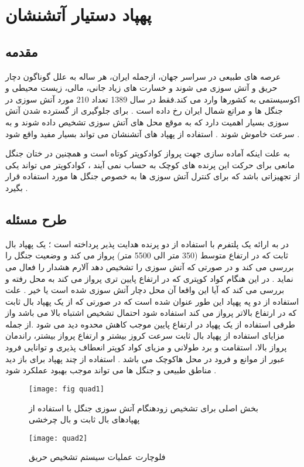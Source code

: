 \chapter{پهپاد دستیار آتشنشان}
\section{مقدمه}
\par
عرصه های طبیعی در سراسر جهان، ازجمله ایران، هر
ساله به علل گوناگون دچار حریق و آتش سوزی می شوند و 
خسارت های زیاد جانی، مالی، زیست محیطی و 
اکوسیستمی به کشورها وارد می کند.فقط در سال 1389
تعداد 210 مورد آتش سوزی در جنگل ها و مراتع شمال ایران 
رخ داده است 
\cite{eskandari2021fire}
. برای جلوگیری از گسترده شدن آتش سوزی بسیار اهمیت دارد که به موقع محل های آتش سوزی تشخیص داده  شوند و به سرعت خاموش شوند . استفاده از پهپاد های آتشنشان می تواند بسیار مفید واقع شود . 
\par
به علت اینکه آماده سازی جهت پرواز کوادکوپتر کوتاه است و همچنین در ختان جنگل مانعی برای حرکت این پرنده های کوچک به حساب نمی آیند  ، کوادکوپتر می تواند یکی از تجهیزاتی باشد که برای کنترل آتش سوزی ها به خصوص جنگل ها مورد استفاده قرار بگیرد . 
\section{طرح مسئله}
در 
\cite{kinaneva2019early} 
به ارائه یک پلتفرم با استفاده از دو پرنده هدایت پذیر پرداخته است ؛ یک پهپاد بال ثابت  که در ارتفاع متوسط (350 متر الی 5500 متر) پرواز می کند و وضعیت جنگل را بررسی می کند و در صورتی که آتش سوزی را تشخیص دهد آلارم هشدار را فعال می نماید . در این هنگام کواد کوپتری که در  ارتفاع پایین تری پرواز می کند به محل رفته و بررسی می کند که آیا این واقعا آن محل دچار آتش سوزی شده است یا خیر . علت استفاده از دو په پهپاد این طور عنوان شده است که در صورتی که از یک پهپاد بال ثابت که در ارتفاع بالاتر پرواز می کند  استفاده شود احتمال تشخیص اشتباه بالا می باشد واز طرفی استفاده از یک پهپاد در ارتفاع پایین موجب کاهش محدوه دید می شود .از جمله مزایای استفاده از پهپاد بال ثابت سرعت کروز بیشتر و ارتفاع پرواز بیشتر، راندمان پرواز بالا، استقامت و برد طولانی و مزیای کواد کوپتر انعطاف پذیری و توانایی فرود عبور از موانع  و فرود در محل هاکوچک می باشد . استفاده از چند پهپاد برای باز دید مناطق طبیعی و جنگل ها می تواند موجب بهبود عملکرد شود .
\begin{figure}[h]
	\texttt{[image: fig quad1]}
	\centering
	\caption{بخش اصلی  برای تشخیص زودهنگام آتش سوزی جنگل با استفاده از پهپادهای بال ثابت و بال چرخشی}
	\cite{kinaneva2019early}
	\label{fig1}
\end{figure} 
\begin{figure}[h]
	\texttt{[image: quad2]}
	\centering
	\caption{فلوچارت عملیات سیستم تشخیص حریق}
	\cite{kinaneva2019early}
	\label{fig2}
\end{figure} 

